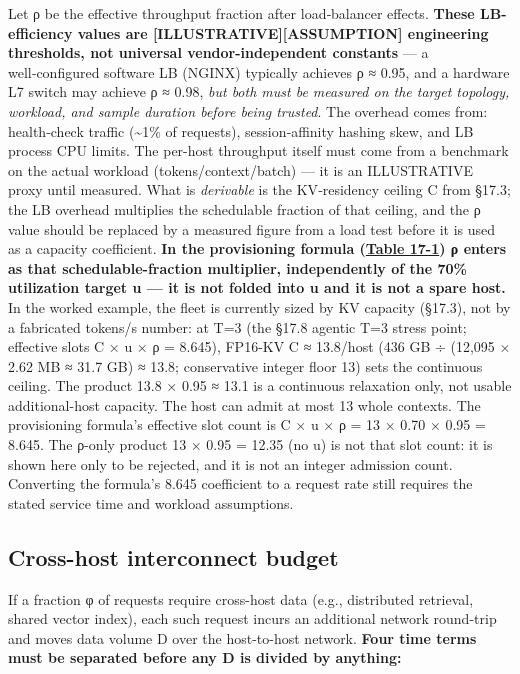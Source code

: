 Let ρ be the effective throughput fraction after load‑balancer effects.
\textbf{These LB-efficiency values are
\mbox{{[}ILLUSTRATIVE{]}}\hspace{0pt}\mbox{{[}ASSUMPTION{]}} engineering thresholds, not universal
vendor-independent constants} --- a well‑configured software LB (NGINX)
typically achieves ρ ≈ 0.95, and a hardware L7 switch may achieve ρ ≈
0.98, \emph{but both must be measured on the target topology, workload,
and sample duration before being trusted}. The overhead comes from:
health‑check traffic (\textasciitilde1\% of requests), session‑affinity
hashing skew, and LB process CPU limits. The per-host throughput itself
must come from a benchmark on the actual workload (tokens/context/batch)
--- it is an ILLUSTRATIVE proxy until measured. What is \emph{derivable}
is the KV‑residency ceiling C from §17.3; the LB overhead multiplies the
schedulable fraction of that ceiling, and the ρ value should be replaced
by a measured figure from a load test before it is used as a capacity
coefficient. \textbf{In the provisioning formula (\hyperref[tab:17.1]{Table 17-1}) ρ enters
as that schedulable-fraction multiplier, independently of the 70\%
utilization target u --- it is not folded into u and it is not a spare
host.} In the worked example, the fleet is currently sized by KV
capacity (§17.3), not by a fabricated tokens/s number: at T=3 (the §17.8
agentic T=3 stress point; effective slots C × u × ρ = 8.645), FP16-KV C
≈ 13.8/host (436 GB ÷ (12,095 × 2.62 MB ≈ 31.7 GB) ≈ 13.8; conservative
integer floor 13) sets the continuous ceiling. The product 13.8 × 0.95 ≈
13.1 is a continuous relaxation only, not usable additional-host
capacity. The host can admit at most 13 whole contexts. The provisioning
formula's effective slot count is C × u × ρ = 13 × 0.70 × 0.95 = 8.645.
The ρ-only product 13 × 0.95 = 12.35 (no u) is not that slot count: it
is shown here only to be rejected, and it is not an integer admission
count. Converting the formula's 8.645 coefficient to a request rate
still requires the stated service time and workload assumptions.

\subsection{Cross-host interconnect
budget}\label{cross-host-interconnect-budget}

If a fraction φ of requests require cross-host data (e.g., distributed
retrieval, shared vector index), each such request incurs an additional
network round-trip and moves data volume D over the host-to-host
network. \textbf{Four time terms must be separated before any D is
divided by anything:}

